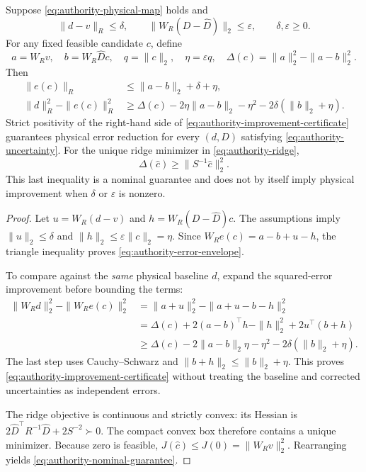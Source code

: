 \begin{proposition}
\label{prop:authority-certificate}
Suppose \eqref{eq:authority-physical-map} holds and
\begin{equation}
 \|d-v\|_R\leq\delta,\qquad
 \|W_R(D-\widehat D)\|_2\leq\varepsilon,
 \qquad \delta,\varepsilon\geq0.
 \label{eq:authority-uncertainty}
\end{equation}
For any fixed feasible candidate $c$, define
\[
 a=W_R v,\quad b=W_R\widehat D c,\quad q=\|c\|_2,\quad
 \eta=\varepsilon q,\quad
 \Delta(c)=\|a\|_2^2-\|a-b\|_2^2.
\]
Then
\begin{align}
 \|e(c)\|_R &\leq \|a-b\|_2+\delta+\eta,
   \label{eq:authority-error-envelope}\\
 \|d\|_R^2-\|e(c)\|_R^2
 &\geq \Delta(c)-2\eta\|a-b\|_2-\eta^2
             -2\delta(\|b\|_2+\eta).
   \label{eq:authority-improvement-certificate}
\end{align}
Strict positivity of the right-hand side of
\eqref{eq:authority-improvement-certificate} guarantees physical error
reduction for every $(d,D)$ satisfying \eqref{eq:authority-uncertainty}.
For the unique ridge minimizer in \eqref{eq:authority-ridge},
\begin{equation}
 \Delta(\widehat c)\geq\|S^{-1}\widehat c\|_2^2.
 \label{eq:authority-nominal-guarantee}
\end{equation}
This last inequality is a nominal guarantee and does not by itself imply
physical improvement when $\delta$ or $\varepsilon$ is nonzero.
\end{proposition}

\begin{proof}
Let $u=W_R(d-v)$ and $h=W_R(D-\widehat D)c$. The assumptions imply
$\|u\|_2\leq\delta$ and $\|h\|_2\leq\varepsilon\|c\|_2=\eta$.
Since $W_R e(c)=a-b+u-h$, the triangle inequality proves
\eqref{eq:authority-error-envelope}.

To compare against the \emph{same} physical baseline $d$, expand the
squared-error improvement before bounding the terms:
\begin{align*}
 \|W_R d\|_2^2-\|W_R e(c)\|_2^2
 &=\|a+u\|_2^2-\|a+u-b-h\|_2^2\\
 &=\Delta(c)+2(a-b)^\top h-\|h\|_2^2
                      +2u^\top(b+h)\\
 &\geq\Delta(c)-2\|a-b\|_2\eta-\eta^2
                      -2\delta(\|b\|_2+\eta).
\end{align*}
The last step uses Cauchy--Schwarz and $\|b+h\|_2\leq\|b\|_2+\eta$.
This proves \eqref{eq:authority-improvement-certificate} without treating
the baseline and corrected uncertainties as independent errors.

The ridge objective is continuous and strictly convex: its Hessian is
$2\widehat D^\top R^{-1}\widehat D+2S^{-2}\succ0$.
The compact convex box therefore contains a unique minimizer. Because zero
is feasible, $J(\widehat c)\leq J(0)=\|W_R v\|_2^2$. Rearranging yields
\eqref{eq:authority-nominal-guarantee}.
\end{proof}

